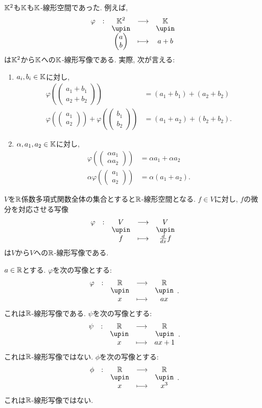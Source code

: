 \begin{example}
$\mathbb{K}^2$も$\mathbb{K}$も$\mathbb{K}$-線形空間であった.
例えば,
\begin{align*}
\shazo{\varphi}{\KK^2}{\KK}
{\begin{pmatrix}a\\b\end{pmatrix}}{a+b}
\end{align*}
は$\mathbb{K}^2$から$\mathbb{K}$への$\mathbb{K}$-線形写像である.
実際, 次が言える:
  \begin{enumerate}
    \item
    $a_i,b_i\in \mathbb{K}$に対し,
    \begin{align*}
    \varphi(\begin{pmatrix}a_1+b_1\\a_2+b_2\end{pmatrix})
    &=(a_1+b_1)+(a_2+b_2)\\
    \varphi(\begin{pmatrix}a_1\\a_2\end{pmatrix})+\varphi(\begin{pmatrix}b_1\\b_2\end{pmatrix})
    &=(a_1+a_2)+(b_2+b_2).
    \end{align*}
    \item
    $\alpha, a_1,a_2\in\mathbb{K}$に対し,
    \begin{align*}
    \varphi(\begin{pmatrix}\alpha a_1\\\alpha a_2\end{pmatrix})
    &=\alpha a_1+\alpha a_2\\
    \alpha \varphi(\begin{pmatrix}a_1\\a_2\end{pmatrix})
    &=\alpha(a_1+a_2).
    \end{align*}
  \end{enumerate}
\end{example}

\begin{example}
$V$を$\mathbb{R}$係数多項式関数全体の集合とすると$\mathbb{R}$-線形空間となる.
$f\in V$に対し, $f$の微分を対応させる写像
\begin{align*}
\shazo{\varphi}{V}{V}
{f}{\frac{d}{dx}f}
\end{align*}
は$V$から$V$への$\mathbb{R}$-線形写像である.
\end{example}


\begin{example}
  $a\in\mathbb{R}$とする.
  $\varphi$を次の写像とする:
  \begin{align*}
    \shazo{\varphi}{\RR}{\RR}{x}{ax}.
  \end{align*}
  これは$\mathbb{R}$-線形写像である.
  $\psi$を次の写像とする:
  \begin{align*}
    \shazo{\psi}{\RR}{\RR}{x}{ax+1}.
  \end{align*}
  これは$\mathbb{R}$-線形写像ではない.
  $\phi$を次の写像とする:
  \begin{align*}
    \shazo{\phi}{\RR}{\RR}{x}{x^3}.
  \end{align*}
  これは$\mathbb{R}$-線形写像ではない.
\end{example}



